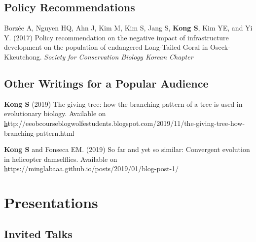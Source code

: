 \documentclass[11pt]{article}
\begin{document}
\subsection*{Policy Recommendations}
\begin{etaremune}


\item Borzée A, Nguyen HQ, Ahn J, Kim M, Kim S, Jang S, \textbf{Kong S}, Kim YE, and Yi Y. (2017) Policy recommendation on the negative impact of infrastructure development on the population of endangered Long-Tailed Goral in Oseck-Kkeutchong. \textit{Society for Conservation Biology Korean Chapter}

\end{etaremune}

\subsection*{Other Writings for a Popular Audience}
\begin{etaremune}

\item \textbf{Kong S} (2019) The giving tree: how the branching pattern of a tree is used in evolutionary biology. Available on \href{http://eeobcourseblogwolfestudents.blogspot.com/2019/11/the-giving-tree-how-branching-pattern.html}http://eeobcourseblogwolfestudents.blogspot.com/2019/11/the-giving-tree-how-branching-pattern.html
\item \textbf{Kong S} and Fonseca  EM. (2019) So far and yet so similar: Convergent evolution in helicopter damselflies. Available on \href{https://minglabaaa.github.io/posts/2019/01/blog-post-1/}https://minglabaaa.github.io/posts/2019/01/blog-post-1/



\end{etaremune}












\section*{Presentations}

\subsection*{Invited Talks}
\end{document}
